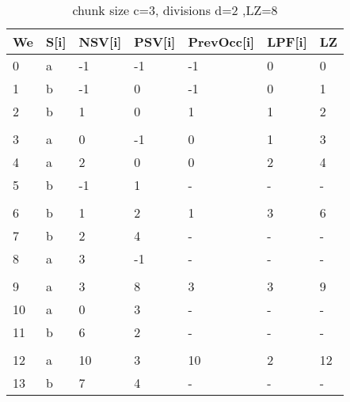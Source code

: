 \begin{table}[h]
\centering
\begin{tabular}{@{}lllllll@{}}
\toprule
We  & S{[}i{]} & NSV{[}i{]} & PSV{[}i{]} & PrevOcc{[}i{]} & LPF{[}i{]} & LZ \\ \midrule
0  & a        & -1         & -1         & -1             & 0          & 0  \\
1  & b        & -1         & 0          & -1             & 0          & 1  \\
2  & b        & 1          & 0          & 1              & 1          & 2  \\
   &          &            &            &                &            &    \\
3  & a        & 0          & -1         & 0              & 1          & 3  \\
4  & a        & 2          & 0          & 0              & 2          & 4  \\
5  & b        & -1         & 1          & -              & -          & -  \\
   &          &            &            &                &            &    \\
6  & b        & 1          & 2          & 1              & 3          & 6  \\
7  & b        & 2          & 4          & -              & -          & -  \\
8  & a        & 3          & -1         & -              & -          & -  \\
   &          &            &            &                &            &    \\
9  & a        & 3          & 8          & 3              & 3          & 9  \\
10 & a        & 0          & 3          & -              & -          & -  \\
11 & b        & 6          & 2          & -              & -          & -  \\
   &          &            &            &                &            &    \\
12 & a        & 10         & 3          & 10             & 2          & 12 \\
13 & b        & 7          & 4          & -              & -          & -  \\ \bottomrule
\end{tabular}
\caption{chunk size c=3, divisions d=2 ,LZ=8}
\label{tab:example3}
\end{table}

